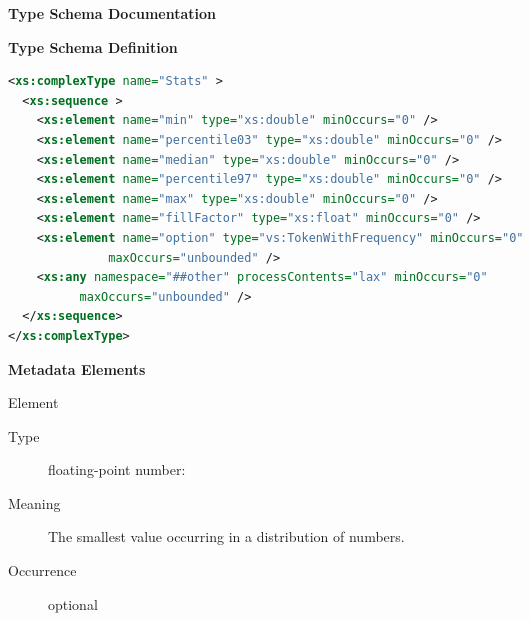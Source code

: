 \documentclass[11pt,a4paper]{ivoa}
\begin{document}
\begin{generated}
\begingroup
        \renewcommand*\descriptionlabel[1]{%
        \hbox to 5.5em{\emph{#1}\hfil}}\vspace{2ex}\noindent\textbf{ Type Schema Documentation}



\vspace{1ex}\noindent\textbf{ Type Schema Definition}

\begin{lstlisting}[language=XML,basicstyle=\footnotesize]
<xs:complexType name="Stats" >
  <xs:sequence >
    <xs:element name="min" type="xs:double" minOccurs="0" />
    <xs:element name="percentile03" type="xs:double" minOccurs="0" />
    <xs:element name="median" type="xs:double" minOccurs="0" />
    <xs:element name="percentile97" type="xs:double" minOccurs="0" />
    <xs:element name="max" type="xs:double" minOccurs="0" />
    <xs:element name="fillFactor" type="xs:float" minOccurs="0" />
    <xs:element name="option" type="vs:TokenWithFrequency" minOccurs="0"
              maxOccurs="unbounded" />
    <xs:any namespace="##other" processContents="lax" minOccurs="0"
          maxOccurs="unbounded" />
  </xs:sequence>
</xs:complexType>
\end{lstlisting}

\vspace{0.5ex}\noindent\textbf{ Metadata Elements}

\begingroup\small\begin{bigdescription}\item[Element \xmlel{min}]
\begin{description}
\item[Type] floating-point number: 
\item[Meaning] The smallest value occurring in a distribution of numbers.
\item[Occurrence] optional


\end{description}
\end{bigdescription}
\end{generated}
\end{document}
